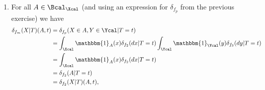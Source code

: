 \begin{enumerate}
\begin{ungradedsolution}
\begin{enumerate}
\begin{enumerate}
      \end{enumerate}
      So, we have to test the provided equality only on sets $A\times B: A\in\Bcal_\Xcal, B\in\Bcal_\Ycal$. For all such $A$ and $B$ and $t\in\Tcal$ we have
      \begin{align*}
        [\delta_{f_2}(X|T)\otimes \delta_{f_3}(Y|T)](A\times B, t)
         & = \int_\Xcal\int_\Ycal \mathbbm{1}_{A\times B}(x, y)\delta_{f_2}(dx|T=t)\delta_{f_3}(dx|T=t)        \\
         & = \int_\Xcal\int_\Ycal \mathbbm{1}_{A}(x)\mathbbm{1}_{B}(y)\delta_{f_2}(dx|T=t)\delta_{f_3}(dx|T=t) \\
         & = \int_\Xcal \mathbbm{1}_{A}(x)\delta_{f_2}(dx|T=t)\int_\Ycal\mathbbm{1}_{B}(y)\delta_{f_3}(dx|T=t) \\
         & = \delta_{f_2}(A|T=t)\delta_{f_3}(B|T=t)                                                            \\
         & = \mathbbm{1}_{A}(f_2(t))\mathbbm{1}_{B}(f_3(t))                                                    \\
         & = \mathbbm{1}_{A\times B}(f_2(t), f_3(t))                                                           \\
         & = \delta_{(f_2, f_3)}(A\times B|T=t)                                                                \\
         & = [\delta_{(f_2, f_3)}(X, Y|T)](A\times B, t)                                                       \\
         & =: [\delta_{f_p}(X, Y|T)](A\times B, t),
      \end{align*}
      so $f_p = (f_2, f_3)$.
      \item For all $A\in \Bcal_\Xcal$ (and using an expression for $\delta_{f_p}$ from the previous exercise) we have
      \begin{align*}
        \delta_{f_m}(X|T)(A, t)
         & = \delta_{f_p}(X\in A, Y\in\Ycal|T=t)                                                              \\
         & = \int_\Xcal\mathbbm{1}_A(x)\delta_{f_2}(dx|T=t)\int_\Ycal\mathbbm{1}_\Ycal(y)\delta_{f_3}(dy|T=t) \\
         & = \int_\Xcal\mathbbm{1}_A(x)\delta_{f_2}(dx|T=t)                                                   \\
         & = \delta_{f_2}(A|T=t)                                                                              \\
         & = \delta_{f_2}(X|T)(A, t),

\end{align*}
\end{enumerate}
\end{ungradedsolution}
\end{enumerate}
